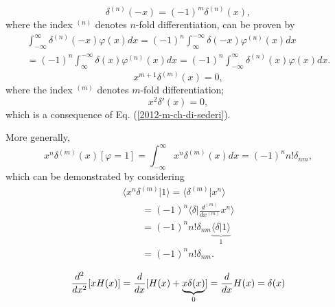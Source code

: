  \begin{equation}
 \delta^{(n)}(-x) =(-1)^m\delta^{(n)}(x)
,
 \end{equation}
where the index $^{(n)}$ denotes $n$-fold differentiation,
can be proven by
{\color{OliveGreen}
\bproof
 \begin{equation}
 \begin{split}
\int _{-\infty}^\infty \delta^{(n)} (-x)  \varphi (x)  dx
 =
(-1)^n \int _\infty^{-\infty} \delta (-x)  \varphi^{(n)} (x) dx \\
 =
(-1)^n \int _\infty^{-\infty} \delta (x)  \varphi^{(n)} (x) dx
= (-1)^n  \int _{-\infty}^\infty \delta^{(n)} (x)  \varphi (x)  dx     .
 \end{split}
 \end{equation}
\eproof
}
 \begin{equation}
 x^{m+1}\delta^{(m)}(x)=0
,
 \end{equation}
 where the index $^{(m)}$ denotes $m$-fold differentiation;
 \begin{equation}
 x^2\delta '(x)=0,
 \end{equation}
which is a  consequence of Eq. (\ref{2012-m-ch-di-sederi}).

More generally,
 \begin{equation}
x^n\delta^{(m)}(x)[\varphi =1] = \int _{-\infty}^\infty x^n\delta^{(m)}(x) dx  = (-1)^n n! \delta_{nm},
 \end{equation}
{\color{OliveGreen} \bproof
which can be demonstrated by considering
 \begin{equation}
 \begin{split}
 \langle x^n \delta^{(m)} \vert 1 \rangle
=
 \langle \delta^{(m)} \vert  x^n \rangle    \\ \qquad
=
(-1)^n
 \langle \delta \vert \frac{d^{(m)}}{d x^{(m)}}  x^n \rangle    \\ \qquad
=
(-1)^n n! \delta_{nm}
 \underbrace{\langle \delta \vert 1 \rangle}_{1}      \\ \qquad
=
(-1)^n n! \delta_{nm} .
\end{split}
 \end{equation}
\eproof
}

 \begin{equation}
 {d^2\over dx^2}[x H (x)] = {d \over dx }[H(x) + \underbrace{x \delta  (x)}_{0}]={d \over dx } H(x)  = \delta (x)
 \end{equation}

